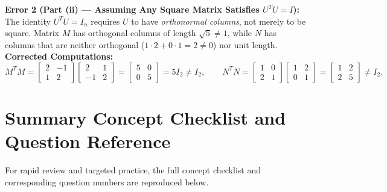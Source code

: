 \documentclass[11pt, letterpaper]{article}
\theoremstyle{definition}
\theoremstyle{remark}
\begin{document}
\textbf{Error 2 (Part (ii) --- Assuming Any Square Matrix Satisfies $U^T U = I$):} The identity $U^T U = I_n$ requires $U$ to have \textit{orthonormal columns}, not merely to be square. Matrix $M$ has orthogonal columns of length $\sqrt{5} \neq 1$, while $N$ has columns that are neither orthogonal ($1\cdot 2 + 0\cdot 1 = 2 \neq 0$) nor unit length. \\
\textbf{Corrected Computations:}
\[
M^T M = \begin{bmatrix} 2 & -1 \\ 1 & 2 \end{bmatrix}\begin{bmatrix} 2 & 1 \\ -1 & 2 \end{bmatrix} = \begin{bmatrix} 5 & 0 \\ 0 & 5 \end{bmatrix} = 5I_2 \neq I_2, \qquad
N^T N = \begin{bmatrix} 1 & 0 \\ 2 & 1 \end{bmatrix}\begin{bmatrix} 1 & 2 \\ 0 & 1 \end{bmatrix} = \begin{bmatrix} 1 & 2 \\ 2 & 5 \end{bmatrix} \neq I_2.
\]

\newpage

\section{Summary Concept Checklist and Question Reference}

For rapid review and targeted practice, the full concept checklist and corresponding question numbers are reproduced below.
\end{document}

